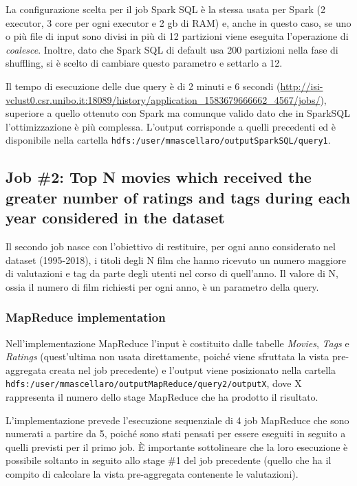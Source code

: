 \documentclass[10pt]{article}
\begin{document}
La configurazione scelta per il job Spark SQL è la stessa usata per Spark (2 executor, 3 core per ogni executor e 2 gb di RAM) e, anche in questo caso, se uno o più file di input sono divisi in più di 12 partizioni viene eseguita l'operazione di \textit{coalesce}. Inoltre, dato che Spark SQL di default usa 200 partizioni nella fase di shuffling, si è scelto di cambiare questo parametro e settarlo a 12.

Il tempo di esecuzione delle due query è di 2 minuti e 6 secondi (\url{http://isi-vclust0.csr.unibo.it:18089/history/application_1583679666662_4567/jobs/}), superiore a quello ottenuto con Spark ma comunque valido dato che in SparkSQL l'ottimizzazione è più complessa. L'output corrisponde a quelli precedenti ed è disponibile nella cartella \texttt{hdfs:/user/mmascellaro/outputSparkSQL/query1}.

\subsection{Job \#2: Top N movies which received the greater number of ratings and tags during each year considered in the dataset}

Il secondo job nasce con l'obiettivo di restituire, per ogni anno considerato nel dataset (1995-2018), i titoli degli N film che hanno ricevuto un numero maggiore di valutazioni e tag da parte degli utenti nel corso di quell'anno. Il valore di N, ossia il numero di film richiesti per ogni anno, è un parametro della query.

\subsubsection{MapReduce implementation}

Nell'implementazione MapReduce l'input è costituito dalle tabelle \textit{Movies}, \textit{Tags} e \textit{Ratings} (quest'ultima non usata direttamente, poiché viene sfruttata la vista pre-aggregata creata nel job precedente) e l'output viene posizionato nella cartella \texttt{hdfs:/user/mmascellaro/outputMapReduce/query2/outputX}, dove X rappresenta il numero dello stage MapReduce che ha prodotto il risultato.

L'implementazione prevede l'esecuzione sequenziale di 4 job MapReduce che sono numerati a partire da 5, poiché sono stati pensati per essere eseguiti in seguito a quelli previsti per il primo job.  È importante sottolineare che la loro esecuzione è possibile soltanto in seguito allo stage \#1 del job precedente (quello che ha il compito di calcolare la vista pre-aggregata contenente le valutazioni).
\end{document}
